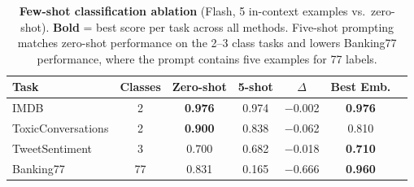 \begin{table}[t]
\centering
\small
\begin{tabular}{lcccccc}
\toprule
\textbf{Task} & \textbf{Classes} & \textbf{Zero-shot} & \textbf{5-shot} & \textbf{$\Delta$} & \textbf{Best Emb.} \\
\midrule
IMDB & 2 & \textbf{0.976} & 0.974 & $-$0.002 & \textbf{0.976} \\
ToxicConversations & 2 & \textbf{0.900} & 0.838 & $-$0.062 & 0.810 \\
TweetSentiment & 3 & 0.700 & 0.682 & $-$0.018 & \textbf{0.710} \\
Banking77 & 77 & 0.831 & 0.165 & $-$0.666 & \textbf{0.960} \\
\bottomrule
\end{tabular}
\caption{\textbf{Few-shot classification ablation} (Flash, 5 in-context examples vs.\ zero-shot).
\textbf{Bold} = best score per task across all methods.
Five-shot prompting matches zero-shot performance on the 2--3 class tasks and lowers Banking77 performance, where the prompt contains five examples for 77 labels.}
\label{tab:ablation_fewshot}
\end{table}
